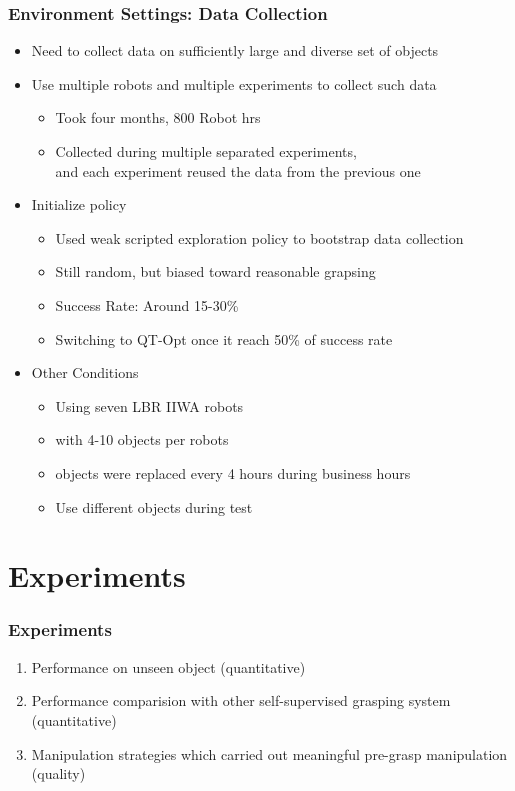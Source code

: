 \documentclass{beamer}
\newcommand{\fifthSec}{Environment Settings}
\newcommand{\sixthSec}{Experiments}
\begin{document}
    \begin{frame}
      \frametitle{\fifthSec : Data Collection}
      \begin{itemize}
        \item Need to collect data on sufficiently large and diverse set of objects
        \item Use multiple robots and multiple experiments to collect such data
        \begin{itemize}
          \item Took four months, 800 Robot hrs
          \item Collected during multiple separated experiments, \\
                and each experiment reused the data from the previous one
          \linebreak
        \end{itemize}
        \item Initialize policy
        \begin{itemize}
          \item Used weak scripted exploration policy to bootstrap data collection
          \item Still random, but biased toward reasonable grapsing
          \item Success Rate: Around 15-30\%
          \item Switching to QT-Opt once it reach 50\% of success rate
          \linebreak
        \end{itemize}
        \item Other Conditions
        \begin{itemize}
          \item Using seven LBR IIWA robots
          \item with 4-10 objects per robots
          \item objects were replaced every 4 hours during business hours
          \item Use different objects during test
        \end{itemize}
      \end{itemize}
    \end{frame}


  \section{\sixthSec}
    \begin{frame}
      \frametitle{\sixthSec}
      \begin{enumerate}
        \item Performance on unseen object (quantitative)
        \item Performance comparision with other self-supervised grasping system (quantitative)
        \item Manipulation strategies which carried out meaningful pre-grasp manipulation (quality)
      \end{enumerate}
    \end{frame}
\end{document}
